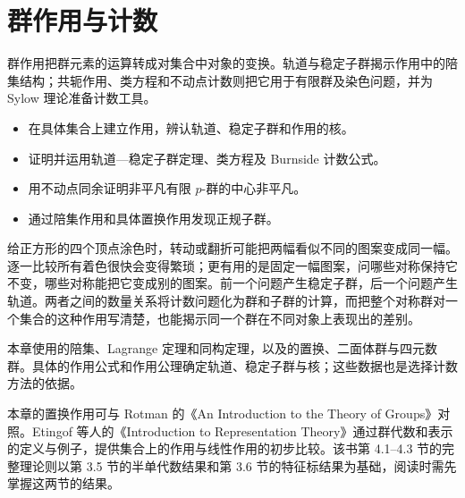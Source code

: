 
\chapter{群作用与计数}
\label{b1:ch:04}

\begin{chapterabstract}
	群作用把群元素的运算转成对集合中对象的变换。轨道与稳定子群揭示作用中的陪集结构；共轭作用、类方程和不动点计数则把它用于有限群及染色问题，并为 Sylow 理论准备计数工具。
\end{chapterabstract}

\begin{learninggoals}
	\begin{itemize}
		\item 在具体集合上建立作用，辨认轨道、稳定子群和作用的核。
		\item 证明并运用轨道—稳定子群定理、类方程及 Burnside 计数公式。
		\item 用不动点同余证明非平凡有限 \(p\)-群的中心非平凡。
		\item 通过陪集作用和具体置换作用发现正规子群。
	\end{itemize}
\end{learninggoals}

给正方形的四个顶点涂色时，转动或翻折可能把两幅看似不同的图案变成同一幅。逐一比较所有着色很快会变得繁琐；更有用的是固定一幅图案，问哪些对称保持它不变，哪些对称能把它变成别的图案。前一个问题产生稳定子群，后一个问题产生轨道。两者之间的数量关系将计数问题化为群和子群的计算，而把整个对称群对一个集合的这种作用写清楚，也能揭示同一个群在不同对象上表现出的差别。

\ProseParagraphBreak

本章使用的陪集、Lagrange 定理和同构定理，以及的置换、二面体群与四元数群。具体的作用公式和作用公理确定轨道、稳定子群与核；这些数据也是选择计数方法的依据。

\ProseParagraphBreak
本章的置换作用可与 Rotman 的《An Introduction to the Theory of Groups》\cite[Chapter 3]{Rotman1995TheoryGroups}对照。Etingof 等人的《Introduction to Representation Theory》\cite[\S\S~2.2--2.3]{EtingofEtAl2011RepresentationTheory}通过群代数和表示的定义与例子，提供集合上的作用与线性作用的初步比较。该书第 4.1--4.3 节的完整理论则以第 3.5 节的半单代数结果和第 3.6 节的特征标结果为基础\cite[\S\S~3.5--3.6, 4.1--4.3]{EtingofEtAl2011RepresentationTheory}，阅读时需先掌握这两节的结果。

